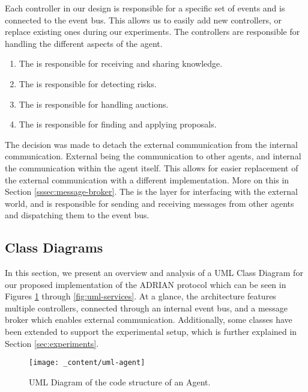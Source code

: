 Each controller in our design is responsible for a specific set of events and is connected to the event bus. This allows us to easily add new controllers, or replace existing ones during our experiments. The controllers are responsible for handling the different aspects of the agent. 

\begin{enumerate}
    \item The  is responsible for receiving and sharing knowledge. 
    \item The  is responsible for detecting risks.
    \item The  is responsible for handling auctions. 
    \item The  is responsible for finding and applying proposals.
\end{enumerate}

The decision was made to detach the external communication from the internal communication. External being the communication to other agents, and internal the communication within the agent itself. This allows for easier replacement of the external communication with a different implementation. More on this in Section \ref{sssec:message-broker}.
The  is the layer for interfacing with the external world, and is responsible for sending and receiving messages from other agents and dispatching them to the event bus.

\subsection{Class Diagrams}
\label{ssec:class-diagrams}

In this section, we present an overview and analysis of a UML Class Diagram for our proposed implementation of the ADRIAN protocol which can be seen in Figures \ref{fig:uml-agent} through \ref{fig:uml-services}. At a glance, the architecture features multiple controllers, connected through an internal event bus, and a message broker which enables external communication. Additionally, some classes have been extended to support the experimental setup, which is further explained in Section \ref{sec:experiments}.

\begin{figure}[H]
    \centering
    \texttt{[image: \_content/uml-agent]}
    \caption{UML Diagram of the code structure of an Agent.}
    \label{fig:uml-agent}
\end{figure}

